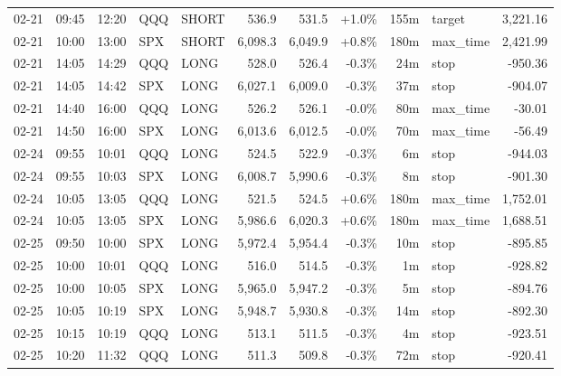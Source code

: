 \documentclass[11pt,a4paper,twoside]{article}
\begin{document}
\begin{center}
\begin{longtable}{>{\color{txtmain}}l l l l l r r r r >{\color{txtmain}}l r}
02-21 & 09:45 & 12:20 & QQQ & SHORT & 536.9 & 531.5 & \textcolor{wingreen}{+1.0\%} & 155m & target & \textcolor{wingreen}{3,221.16} \\
02-21 & 10:00 & 13:00 & SPX & SHORT & 6,098.3 & 6,049.9 & \textcolor{wingreen}{+0.8\%} & 180m & max\_time & \textcolor{wingreen}{2,421.99} \\
02-21 & 14:05 & 14:29 & QQQ & LONG & 528.0 & 526.4 & \textcolor{lossred}{-0.3\%} & 24m & stop & \textcolor{lossred}{-950.36} \\
02-21 & 14:05 & 14:42 & SPX & LONG & 6,027.1 & 6,009.0 & \textcolor{lossred}{-0.3\%} & 37m & stop & \textcolor{lossred}{-904.07} \\
02-21 & 14:40 & 16:00 & QQQ & LONG & 526.2 & 526.1 & \textcolor{lossred}{-0.0\%} & 80m & max\_time & \textcolor{lossred}{-30.01} \\
02-21 & 14:50 & 16:00 & SPX & LONG & 6,013.6 & 6,012.5 & \textcolor{lossred}{-0.0\%} & 70m & max\_time & \textcolor{lossred}{-56.49} \\
02-24 & 09:55 & 10:01 & QQQ & LONG & 524.5 & 522.9 & \textcolor{lossred}{-0.3\%} & 6m & stop & \textcolor{lossred}{-944.03} \\
02-24 & 09:55 & 10:03 & SPX & LONG & 6,008.7 & 5,990.6 & \textcolor{lossred}{-0.3\%} & 8m & stop & \textcolor{lossred}{-901.30} \\
02-24 & 10:05 & 13:05 & QQQ & LONG & 521.5 & 524.5 & \textcolor{wingreen}{+0.6\%} & 180m & max\_time & \textcolor{wingreen}{1,752.01} \\
02-24 & 10:05 & 13:05 & SPX & LONG & 5,986.6 & 6,020.3 & \textcolor{wingreen}{+0.6\%} & 180m & max\_time & \textcolor{wingreen}{1,688.51} \\
02-25 & 09:50 & 10:00 & SPX & LONG & 5,972.4 & 5,954.4 & \textcolor{lossred}{-0.3\%} & 10m & stop & \textcolor{lossred}{-895.85} \\
02-25 & 10:00 & 10:01 & QQQ & LONG & 516.0 & 514.5 & \textcolor{lossred}{-0.3\%} & 1m & stop & \textcolor{lossred}{-928.82} \\
02-25 & 10:00 & 10:05 & SPX & LONG & 5,965.0 & 5,947.2 & \textcolor{lossred}{-0.3\%} & 5m & stop & \textcolor{lossred}{-894.76} \\
02-25 & 10:05 & 10:19 & SPX & LONG & 5,948.7 & 5,930.8 & \textcolor{lossred}{-0.3\%} & 14m & stop & \textcolor{lossred}{-892.30} \\
02-25 & 10:15 & 10:19 & QQQ & LONG & 513.1 & 511.5 & \textcolor{lossred}{-0.3\%} & 4m & stop & \textcolor{lossred}{-923.51} \\
02-25 & 10:20 & 11:32 & QQQ & LONG & 511.3 & 509.8 & \textcolor{lossred}{-0.3\%} & 72m & stop & \textcolor{lossred}{-920.41} \\

\end{longtable}
\end{center}
\end{document}
